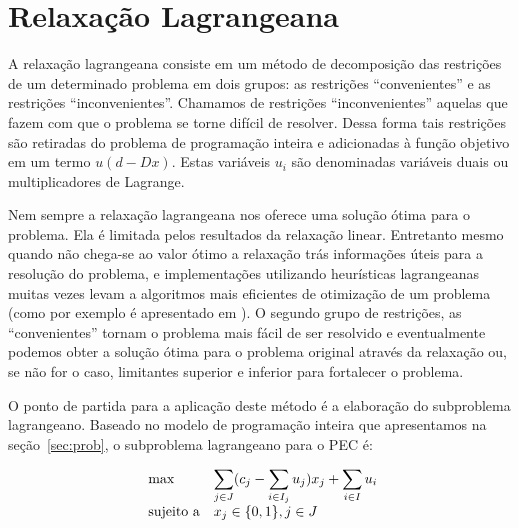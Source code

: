 \documentclass{article}
\begin{document}
	
	\section{Relaxação Lagrangeana}\label{sec:relag}
	A relaxação lagrangeana consiste em um método de decomposição das restrições de um determinado problema em dois grupos: as restrições \enquote{convenientes} e as restrições \enquote{inconvenientes}. 
	Chamamos de restrições \enquote{inconvenientes} aquelas que fazem com que o problema se torne difícil de resolver. Dessa forma tais restrições são
	retiradas do problema de programação inteira e adicionadas à função objetivo em um termo $u(d - Dx)$. Estas variáveis $u_i$ são denominadas variáveis duais ou multiplicadores de Lagrange.
	
	Nem sempre a relaxação lagrangeana nos oferece uma solução ótima para o problema. Ela é limitada pelos resultados da relaxação linear. Entretanto mesmo quando não chega-se ao valor ótimo a relaxação trás informações úteis para a resolução do problema, e implementações utilizando heurísticas lagrangeanas muitas vezes levam a algoritmos mais eficientes de otimização de um problema (como por exemplo é apresentado em \cite{guo2005using}). 
	O segundo grupo de restrições, as \enquote{convenientes} tornam o problema mais fácil de ser resolvido e eventualmente podemos obter a solução ótima para o problema original através da relaxação ou, se não for o caso, limitantes superior e inferior para fortalecer o problema. 
	
	O ponto de partida para a aplicação deste método é a elaboração do subproblema lagrangeano. Baseado no modelo de programação inteira que apresentamos na seção~\ref{sec:prob}, o subproblema lagrangeano para o PEC é: 
	
	\begin{equation*}
        \begin{array}{ll@{}ll}
            \text{max}  & \displaystyle\sum\limits_{j \in J} (c_{j} - \displaystyle\sum\limits_{i \in I_j} u_{j})x_j+  \displaystyle\sum\limits_{i \in I} u_{i}\\
            \text{sujeito a}
                 &                                                x_{j} \in \{0,1\}, j \in J
        \end{array}
    \end{equation*}
	
	
\end{document}
